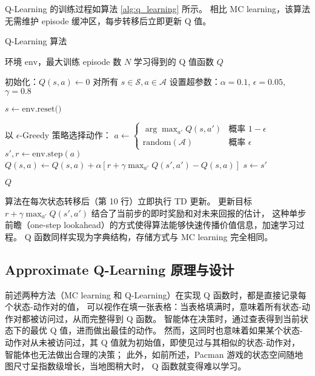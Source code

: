 Q-Learning 的训练过程如算法 \ref{alg:q_learning} 所示。
相比 MC learning，该算法无需维护 episode 缓冲区，每步转移后立即更新 Q 值。

\begin{algorithm}[h]
    \caption{Q-Learning 算法}
    \small
    \label{alg:q_learning}
    \begin{algorithmic}[1]
        \Require 环境 $\text{env}$，最大训练 episode 数 $N$
        \Ensure 学习得到的 Q 值函数 $Q$
        
        \State 初始化：$Q(s,a) \leftarrow 0$ 对所有 $s \in \mathcal{S}, a \in \mathcal{A}$
        \State 设置超参数：$\alpha = 0.1$, $\epsilon = 0.05$, $\gamma = 0.8$
        
            \State $s \leftarrow \text{env.reset()}$
            
                \State 以 $\epsilon$-Greedy 策略选择动作：
                \State \quad $a \leftarrow \begin{cases} 
                    \arg\max_{a'} Q(s, a') & \text{概率 } 1-\epsilon \\
                    \text{random}(\mathcal{A}) & \text{概率 } \epsilon
                \end{cases}$
                \State $s', r \leftarrow \text{env.step}(a)$
                \State $Q(s, a) \leftarrow Q(s, a) + \alpha \left[ r + \gamma \max_{a'} Q(s', a') - Q(s, a) \right]$ 
                \State $s \leftarrow s'$
            \EndWhile
        \EndFor
        
        \Return $Q$
    \end{algorithmic}
\end{algorithm}

算法在每次状态转移后（第 10 行）立即执行 TD 更新。
更新目标 $r + \gamma \max_{a'} Q(s', a')$ 结合了当前步的即时奖励和对未来回报的估计，
这种单步前瞻（one-step lookahead）的方式使得算法能够快速传播价值信息，加速学习过程。
Q 函数同样实现为字典结构，存储方式与 MC learning 完全相同。


\subsection{Approximate Q-Learning 原理与设计}

前述两种方法（MC learning 和 Q-Learning）在实现 Q 函数时，都是直接记录每个状态-动作对的值，
可以视作在填一张表格：当表格填满时，意味着所有状态-动作对都被访问过，从而完整得到 Q 函数。
智能体在决策时，通过查表得到当前状态下的最优 Q 值，进而做出最佳的动作。
然而，这同时也意味着如果某个状态-动作对从未被访问过，其 Q 值就为初始值，即使见过与其相似的状态-动作对，
智能体也无法做出合理的决策；
此外，如前所述，Pacman 游戏的状态空间随地图尺寸呈指数级增长，当地图稍大时，
Q 函数就变得难以学习。

